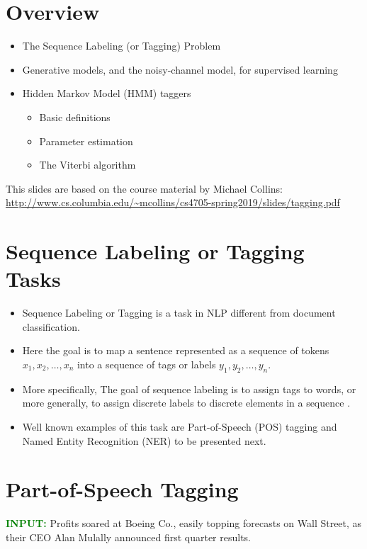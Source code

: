 

\section{Overview}
  \begin{itemize}
    \item The Sequence Labeling (or Tagging) Problem
    \item Generative models, and the noisy-channel model, for supervised learning
    \item Hidden Markov Model (HMM) taggers
    \begin{itemize}\scriptsize
    \item Basic definitions
    \item Parameter estimation
    \item The Viterbi algorithm
    \end{itemize}
  \end{itemize}
 This slides are based on the course material by Michael Collins: \url{http://www.cs.columbia.edu/~mcollins/cs4705-spring2019/slides/tagging.pdf}


\section{Sequence Labeling or Tagging Tasks}

  \begin{itemize}
    \item Sequence Labeling or Tagging is a task in NLP different from document classification.
    \item Here the goal is to map a sentence represented as a sequence of tokens $x_1,x_2,\dots,x_n$ into a sequence of tags or labels $y_1,y_2,\dots,y_n$.
      \item More specifically, The goal of sequence labeling is to assign tags to words, or more generally, to assign discrete labels to discrete elements in a sequence \cite{jacobbook}.

    \item Well known examples of this task are Part-of-Speech (POS) tagging and Named Entity Recognition (NER) to be presented next.
    \end{itemize}


\section{Part-of-Speech Tagging}
  \textcolor{green}{\textbf{INPUT:}}
  Profits soared at Boeing Co., easily topping forecasts on Wall Street, as their CEO Alan Mulally announced first quarter results.  \vspace{0.5cm}
  
